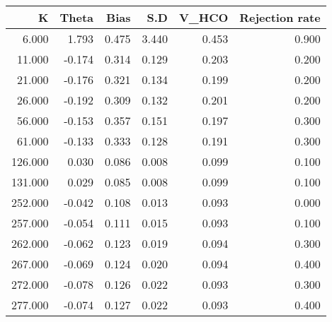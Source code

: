 \begin{tabular}{rrrrrr}
  \hline
K & Theta & Bias & S.D & V\_HCO & Rejection rate \\ 
  \hline
6.000 & 1.793 & 0.475 & 3.440 & 0.453 & 0.900 \\ 
  11.000 & -0.174 & 0.314 & 0.129 & 0.203 & 0.200 \\ 
  21.000 & -0.176 & 0.321 & 0.134 & 0.199 & 0.200 \\ 
  26.000 & -0.192 & 0.309 & 0.132 & 0.201 & 0.200 \\ 
  56.000 & -0.153 & 0.357 & 0.151 & 0.197 & 0.300 \\ 
  61.000 & -0.133 & 0.333 & 0.128 & 0.191 & 0.300 \\ 
  126.000 & 0.030 & 0.086 & 0.008 & 0.099 & 0.100 \\ 
  131.000 & 0.029 & 0.085 & 0.008 & 0.099 & 0.100 \\ 
  252.000 & -0.042 & 0.108 & 0.013 & 0.093 & 0.000 \\ 
  257.000 & -0.054 & 0.111 & 0.015 & 0.093 & 0.100 \\ 
  262.000 & -0.062 & 0.123 & 0.019 & 0.094 & 0.300 \\ 
  267.000 & -0.069 & 0.124 & 0.020 & 0.094 & 0.400 \\ 
  272.000 & -0.078 & 0.126 & 0.022 & 0.093 & 0.300 \\ 
  277.000 & -0.074 & 0.127 & 0.022 & 0.093 & 0.400 \\ 
   \hline
\end{tabular}
